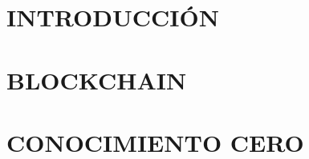 \documentclass[12pt, oneside]{book}
\begin{document}
\frontmatter



\newpage
\setcounter{page}{1}


\newpage


\newpage


\newpage


\newpage


\newpage
\tableofcontents

\newpage
\listoffigures

\newpage
\listoftables

\newpage



\mainmatter
\chapterformatdefault

\chapter{INTRODUCCIÓN}
\label{chp:introduccion}
\thispagestyle{empty}


\chapter{BLOCKCHAIN}
\label{chp:blockchain}
\thispagestyle{empty}






\chapter{CONOCIMIENTO CERO}
\label{chp:conocimiento_cero}





\end{document}
